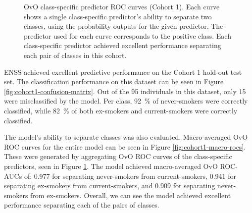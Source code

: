 \documentclass{article} %
\begin{document}
\begin{figure}[p]
\begin{subfigure}{0.46\linewidth}
    \end{subfigure}
    \caption[Class-specific predictor ROC curves (Cohort 1 - Test)]{OvO class-specific predictor ROC curves (Cohort 1). Each curve shows a single class-specific predictor's ability to separate two classes, using the probability outputs for the given predictor. The predictor used for each curve corresponds to the positive class. Each class-specific predictor achieved excellent performance separating each pair of classes in this cohort.}
    \label{fig:cohort1-initial-rocs}
\end{figure}

ENSS achieved excellent predictive performance on the Cohort 1 hold-out test set. The classification performance on this dataset can be seen in Figure \ref{fig:cohort1-confusion-matrix}. Out of the 95 individuals in this dataset, only 15 were misclassified by the model. Per class, \SI{92}{\percent} of never-smokers were correctly classified, while \SI{82}{\percent} of both ex-smokers and current-smokers were correctly classified.

The model's ability to separate classes was also evaluated. Macro-averaged OvO ROC curves for the entire model can be seen in Figure \ref{fig:cohort1-macro-rocs}. These were generated by aggregating OvO ROC curves of the class-specific predictors, seen in Figure \ref{fig:cohort1-initial-rocs}. The model achieved macro-averaged OvO ROC-AUCs of: 0.977 for separating never-smokers from current-smokers, 0.941 for separating ex-smokers from current-smokers, and 0.909 for separating never-smokers from ex-smokers. Overall, we can see the model achieved excellent performance separating each of the pairs of classes.
\end{document}
